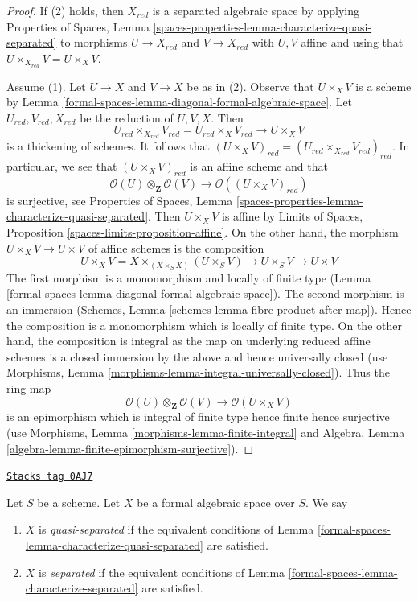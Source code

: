 \begin{proof}
If (2) holds, then $X_{red}$ is a separated algebraic space
by applying Properties of Spaces, Lemma
\ref{spaces-properties-lemma-characterize-quasi-separated}
to morphisms $U \to X_{red}$ and $V \to X_{red}$
with $U, V$ affine and using that $U \times_{X_{red}} V = U \times_X V$.

\medskip\noindent
Assume (1). Let $U \to X$ and $V \to X$ be as in (2).
Observe that $U \times_X V$ is a scheme by
Lemma \ref{formal-spaces-lemma-diagonal-formal-algebraic-space}.
Let $U_{red}, V_{red}, X_{red}$ be the reduction of $U, V, X$.
Then
$$
U_{red} \times_{X_{red}} V_{red} = U_{red} \times_X V_{red} \to U \times_X V
$$
is a thickening of schemes. It follows that
$(U \times_X V)_{red} = (U_{red} \times_{X_{red}} V_{red})_{red}$.
In particular, we see that $(U \times_X V)_{red}$ is an affine scheme
and that
$$
\mathcal{O}(U) \otimes_\mathbf{Z} \mathcal{O}(V)
\longrightarrow
\mathcal{O}((U \times_X V)_{red})
$$
is surjective, see Properties of Spaces, Lemma
\ref{spaces-properties-lemma-characterize-quasi-separated}.
Then $U \times_X V$ is affine by
Limits of Spaces, Proposition \ref{spaces-limits-proposition-affine}.
On the other hand, the morphism $U \times_X V \to U \times V$
of affine schemes is the composition
$$
U \times_X V = X \times_{(X \times_S X)} (U \times_S V)
\to U \times_S V \to U \times V
$$
The first morphism is a monomorphism and locally of finite type
(Lemma \ref{formal-spaces-lemma-diagonal-formal-algebraic-space}).
The second morphism is an immersion
(Schemes, Lemma \ref{schemes-lemma-fibre-product-after-map}).
Hence the composition is a monomorphism which is locally of finite type.
On the other hand, the composition is integral as the map on
underlying reduced affine schemes is a closed immersion
by the above and hence universally closed (use
Morphisms, Lemma \ref{morphisms-lemma-integral-universally-closed}).
Thus the ring map
$$
\mathcal{O}(U) \otimes_\mathbf{Z} \mathcal{O}(V)
\longrightarrow
\mathcal{O}(U \times_X V)
$$
is an epimorphism which is integral of finite type
hence finite hence surjective (use
Morphisms, Lemma \ref{morphisms-lemma-finite-integral}
and
Algebra, Lemma \ref{algebra-lemma-finite-epimorphism-surjective}).
\end{proof}

\begin{definition}[Separated]
\label{formal-spaces-definition-separated}
\href{https://stacks.math.columbia.edu/tag/0AJ7}{\texttt{Stacks tag 0AJ7}}

Let $S$ be a scheme. Let $X$ be a formal algebraic space over $S$.
We say
\begin{enumerate}
\item $X$ is {\it quasi-separated} if the equivalent conditions of
Lemma \ref{formal-spaces-lemma-characterize-quasi-separated} are satisfied.
\item $X$ is {\it separated} if the equivalent conditions of
Lemma \ref{formal-spaces-lemma-characterize-separated} are satisfied.
\end{enumerate}
\end{definition}

